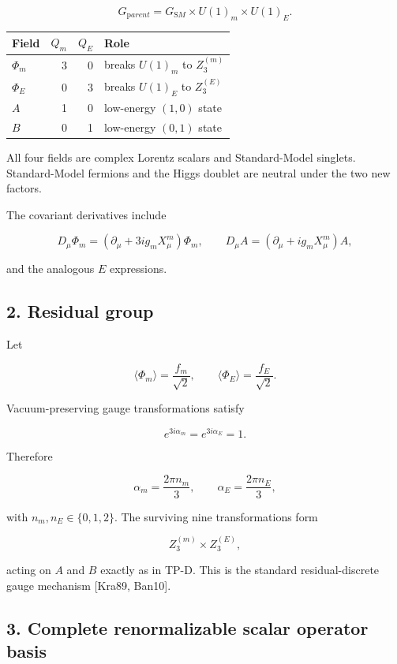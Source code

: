 \documentclass[
]{article}
\begin{document}
\[
G_{\mathrm parent}=G_{\mathrm SM}\times U(1)_m\times U(1)_E.
\]

\begin{longtable}[]{@{}lrrl@{}}
\toprule\noalign{}
Field & \(Q_m\) & \(Q_E\) & Role \\
\midrule\noalign{}
\endhead
\bottomrule\noalign{}
\endlastfoot
\(\Phi_m\) & 3 & 0 & breaks \(U(1)_m\) to \(Z_3^{(m)}\) \\
\(\Phi_E\) & 0 & 3 & breaks \(U(1)_E\) to \(Z_3^{(E)}\) \\
\(A\) & 1 & 0 & low-energy \((1,0)\) state \\
\(B\) & 0 & 1 & low-energy \((0,1)\) state \\
\end{longtable}

All four fields are complex Lorentz scalars and Standard-Model singlets.
Standard-Model fermions and the Higgs doublet are neutral under the two
new factors.

The covariant derivatives include

\[
D_\mu\Phi_m=(\partial_\mu+3ig_mX^m_\mu)\Phi_m,
\qquad
D_\mu A=(\partial_\mu+ig_mX^m_\mu)A,
\]

and the analogous \(E\) expressions.

\hypertarget{residual-group}{%
\subsection{2. Residual group}\label{residual-group}}

Let

\[
\langle\Phi_m\rangle=\frac{f_m}{\sqrt2},
\qquad
\langle\Phi_E\rangle=\frac{f_E}{\sqrt2}.
\]

Vacuum-preserving gauge transformations satisfy

\[
e^{3i\alpha_m}=e^{3i\alpha_E}=1.
\]

Therefore

\[
\alpha_m=\frac{2\pi n_m}{3},\qquad
\alpha_E=\frac{2\pi n_E}{3},
\]

with \(n_m,n_E\in\{0,1,2\}\). The surviving nine transformations form

\[
Z_3^{(m)}\times Z_3^{(E)},
\]

acting on \(A\) and \(B\) exactly as in TP-D. This is the standard
residual-discrete gauge mechanism {[}Kra89, Ban10{]}.

\hypertarget{complete-renormalizable-scalar-operator-basis}{%
\subsection{3. Complete renormalizable scalar operator
basis}\label{complete-renormalizable-scalar-operator-basis}}
\end{document}
